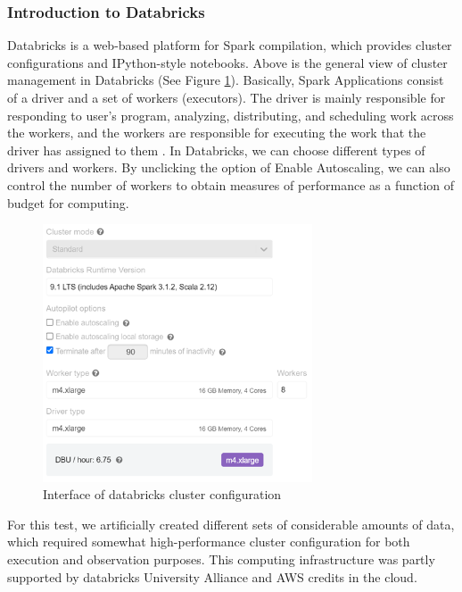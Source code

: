 \documentclass[12pt]{article}
\theoremstyle{definition}
\begin{document}
\subsubsection{Introduction to Databricks}
Databricks is a web-based platform for Spark compilation, which provides cluster configurations and IPython-style notebooks. Above is the general view of cluster management in Databricks (See Figure \ref{fig:databricks_cluster}). Basically, Spark Applications consist of a driver and a set of workers (executors). The driver is mainly responsible for responding to user’s program, analyzing, distributing, and scheduling work across the workers, and the workers are responsible for executing the work that the driver has assigned to them \cite{spark_guide_2018}. In Databricks, we can choose different types of drivers and workers. By unclicking the option of Enable Autoscaling, we can also control the number of workers to obtain measures of performance as a function of budget for computing.

\begin{figure}
  \centering
  \includegraphics[width=8cm]{Databricks_cluster.jpg}
  \caption{Interface of databricks cluster configuration}
  \label{fig:databricks_cluster}
\end{figure}

For this test, we artificially created different sets of considerable amounts of data, which required somewhat high-performance cluster configuration for both execution and observation purposes. This computing infrastructure was partly supported by databricks University Alliance and AWS credits in the cloud.
\end{document}
